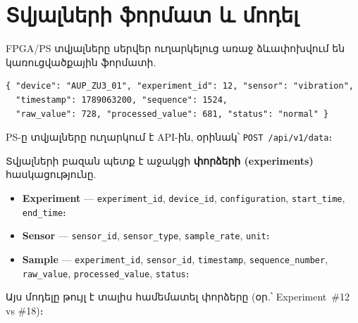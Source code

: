 \chapter{Տվյալների ֆորմատ և մոդել}
\label{ch:data}

FPGA/PS տվյալները սերվեր ուղարկելուց առաջ ձևափոխվում են կառուցվածքային ֆորմատի.
\begin{verbatim}
{ "device": "AUP_ZU3_01", "experiment_id": 12, "sensor": "vibration",
  "timestamp": 1789063200, "sequence": 1524,
  "raw_value": 728, "processed_value": 681, "status": "normal" }
\end{verbatim}
PS-ը տվյալները ուղարկում է API-ին, օրինակ՝ \texttt{POST /api/v1/data}։

Տվյալների բազան պետք է աջակցի \textbf{փորձերի (experiments)} հասկացությունը.
\begin{itemize}
  \item \textbf{Experiment} — \texttt{experiment\_id}, \texttt{device\_id}, \texttt{configuration}, \texttt{start\_time}, \texttt{end\_time}։
  \item \textbf{Sensor} — \texttt{sensor\_id}, \texttt{sensor\_type}, \texttt{sample\_rate}, \texttt{unit}։
  \item \textbf{Sample} — \texttt{experiment\_id}, \texttt{sensor\_id}, \texttt{timestamp}, \texttt{sequence\_number}, \texttt{raw\_value}, \texttt{processed\_value}, \texttt{status}։
\end{itemize}
Այս մոդելը թույլ է տալիս համեմատել փորձերը (օր.՝ Experiment~\#12 vs \#18)։
